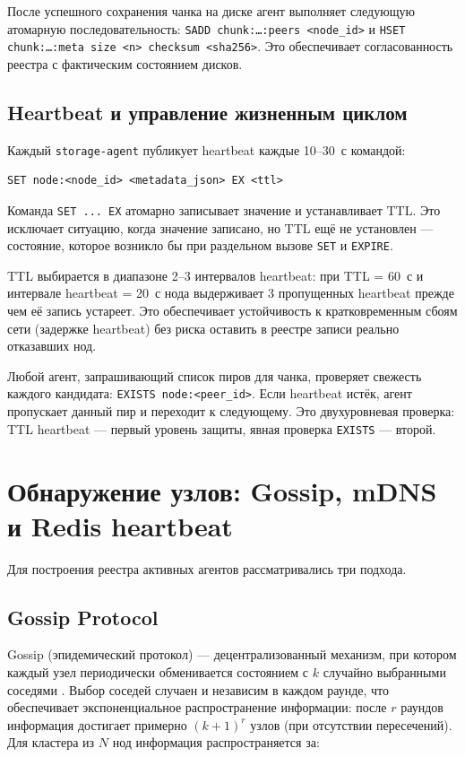 После успешного сохранения чанка на диске агент выполняет следующую атомарную последовательность: \texttt{SADD chunk:\ldots:peers <node\_id>} и \texttt{HSET chunk:\ldots:meta size <n> checksum <sha256>}. Это обеспечивает согласованность реестра с фактическим состоянием дисков.

\subsection*{Heartbeat и управление жизненным циклом}

Каждый \texttt{storage-agent} публикует heartbeat каждые 10--30~с командой:

\begin{verbatim}
SET node:<node_id> <metadata_json> EX <ttl>
\end{verbatim}

Команда \texttt{SET ... EX} атомарно записывает значение и устанавливает TTL. Это исключает ситуацию, когда значение записано, но TTL ещё не установлен --- состояние, которое возникло бы при раздельном вызове \texttt{SET} и \texttt{EXPIRE}.

TTL выбирается в диапазоне 2--3 интервалов heartbeat: при TTL = 60~с и интервале heartbeat = 20~с нода выдерживает 3 пропущенных heartbeat прежде чем её запись устареет. Это обеспечивает устойчивость к кратковременным сбоям сети (задержке heartbeat) без риска оставить в реестре записи реально отказавших нод.

Любой агент, запрашивающий список пиров для чанка, проверяет свежесть каждого кандидата: \texttt{EXISTS node:<peer\_id>}. Если heartbeat истёк, агент пропускает данный пир и переходит к следующему. Это двухуровневая проверка: TTL heartbeat --- первый уровень защиты, явная проверка \texttt{EXISTS} --- второй.

\section{Обнаружение узлов: Gossip, mDNS и Redis heartbeat}

Для построения реестра активных агентов рассматривались три подхода.

\subsection*{Gossip Protocol}

Gossip (эпидемический протокол) --- децентрализованный механизм, при котором каждый узел периодически обменивается состоянием с $k$ случайно выбранными соседями \cite{gossip_protocol_overview}. Выбор соседей случаен и независим в каждом раунде, что обеспечивает экспоненциальное распространение информации: после $r$ раундов информация достигает примерно $(k{+}1)^r$ узлов (при отсутствии пересечений). Для кластера из $N$ нод информация распространяется за:

